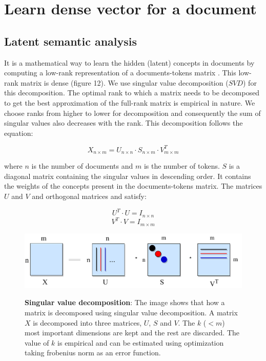 \section{Learn dense vector for a document}
\subsection{Latent semantic analysis}
    It is a mathematical way to learn the hidden (latent) concepts in documents by computing a low-rank representation of a documents-tokens matrix \cite{Foltz1996, Shapiro2000, Landauer1998}. This low-rank matrix is dense (figure 12). We use singular value decomposition ($SVD$) for this decomposition. The optimal rank to which a matrix needs to be decomposed to get the best approximation of the full-rank matrix is empirical in nature. We choose ranks from higher to lower for decomposition and consequently the sum of singular values also decreases with the rank. This decomposition follows the equation:
    
    \begin{equation}
    X_{n \times m} = U_{n \times n} \cdot S_{n \times m} \cdot V_{m \times m}^T
    \end{equation}
    
    where $n$ is the number of documents and $m$ is the number of tokens. $S$ is a diagonal matrix containing the singular values in descending order. It contains the weights of the concepts present in the documents-tokens matrix. The matrices $U$ and $V$ and orthogonal matrices and satisfy:
    
    \begin{equation}
    U^T \cdot U = I_{n \times n}
    \end{equation}
    \begin{equation}
    V^T \cdot V = I_{m \times m}
    \end{equation}
    
\begin{figure}[h]
\begin{centering}
    {\includegraphics[scale=0.7]{figures/usv.pdf}}
    \caption[Pictorial representation of singular value decomposition]{\textbf{Singular value decomposition}: The image shows that how a matrix is decomposed using singular value decomposition. A matrix $X$ is decomposed into three matrices, $U$, $S$ and $V$. The $k$ ($<m$) most important dimensions are kept and the rest are discarded. The value of $k$ is empirical and can be estimated using optimization taking frobenius norm as an error function.}
\end{centering}
\end{figure}

